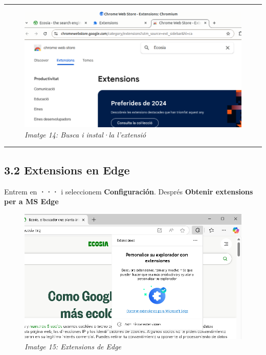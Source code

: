 \documentclass[
  a4paper,
]{article}
\begin{document}
\begin{center}\rule{0.5\linewidth}{0.5pt}\end{center}

\begin{figure}
\centering
\includegraphics{png/3-ChromeExtensions.png}
\caption{\emph{Imatge 14: Busca i instal·la l'extensió}}
\end{figure}

\begin{center}\rule{0.5\linewidth}{0.5pt}\end{center}

\subsection{3.2 Extensions en Edge}\label{extensions-en-edge}

Entrem en \textbf{···} i seleccionem \textbf{Configuración}. Després
\textbf{Obtenir extensions per a MS Edge}

\begin{figure}
\centering
\includegraphics{png/0-EdgeExtensions.png}
\caption{\emph{Imatge 15: Extensions de Edge}}
\end{figure}
\end{document}
